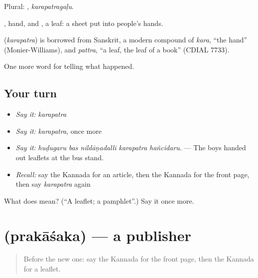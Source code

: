 Plural: , \emph{karapatragaḷu}.

, hand, and , a leaf: a sheet put into people's hands.

\begin{cousinweb}
\textbf{} (\emph{karapatra}) is borrowed from Sanskrit, a modern compound of \emph{kara}, \textquotedblleft{}the hand\textquotedblright{} (Monier-Williams), and \emph{pattra}, \textquotedblleft{}a leaf, the leaf of a book\textquotedblright{} (CDIAL 7733).
\end{cousinweb}

\begin{grammarlens}[title={What you've built}]
One more word for telling what happened.
\end{grammarlens}

\subsection*{Your turn}
\begin{itemize}
\raggedright
  \item \emph{Say it:} \emph{karapatra}
  \item \emph{Say it:} \emph{karapatra}, once more
  \item \emph{Say it:} \emph{huḍugaru bas nildāṇadalli karapatra hañcidaru.} — The boys handed out leaflets at the bus stand.
  \item \emph{Recall:} say the Kannada for an article, then the Kannada for the front page, then say \emph{karapatra} again
\end{itemize}

\begin{tcolorbox}[breakable,colback=teal!4,colframe=teal!35!black,title={Before you move on}]
What does  mean? (\textquotedblleft{}A leaflet; a pamphlet\textquotedblright{}.) Say it once more.
\end{tcolorbox}
\section[\texorpdfstring{\kn{ಪ್ರಕಾಶಕ} (prakāśaka)}{ಪ್ರಕಾಶಕ (prakāśaka)}]{ (prakāśaka) — a publisher}

\label{lesson:KA-C335-prakasaka}



\begin{quote}
Before the new one: say the Kannada for the front page, then the Kannada for a leaflet.
\end{quote}

